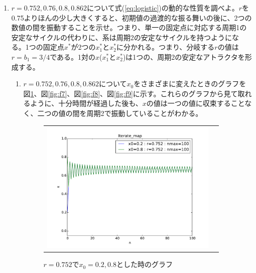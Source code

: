 \documentclass{jsarticle}
\begin{document}
\begin{enumerate}
\begin{enumerate}
\begin{figure}[H]
\begin{center}
\begin{tabular}{cc}
    \end{tabular}
    \end{center}
    \end{figure} 
  \end{enumerate}
  
 \item $r=0.752, 0.76, 0.8, 0.862$について式(\ref{eq:logistic})の動的な性質を調べよ。$r$を0.75よりほんの少し大きくすると、初期値の過渡的な振る舞いの後に、2つの数値の間を振動することを示せ。つまり、単一の固定点に対応する周期1の安定なサイクルの代わりに、系は周期2の安定なサイクルを持つようになる。1つの固定点$x^{*}$が2つの$x_{1}^{*}$と$x_{2}^{*}$に分かれる。つまり、分岐する$r$の値は$r=b_{1}=3/4$である。1対の$x$($x_{1}^{*}$と$x_{2}^{*}$)は1つの、周期2の安定なアトラクタを形成する。
 
  \begin{enumerate}
   \item $r=0.752, 0.76, 0.8, 0.862$について$x_{0}$をさまざまに変えたときのグラフを図\ref{fig:f6}、図\ref{fig:f7}、図\ref{fig:f8}、図\ref{fig:f9}に示す。これらのグラフから見て取れるように、十分時間が経過した後も、$x$の値は一つの値に収束することなく、二つの値の間を周期2で振動していることがわかる。
   
   \begin{figure}[H]
   \begin{center}
    \begin{tabular}{cc}
    
      \begin{minipage}{0.5\hsize}
	\begin{center}
	  \includegraphics[width=8.5cm]{figure_6.pdf}
	  \caption{$r=0.752$で$x_{0}=0.2, 0.8$とした時のグラフ}
	  \label{fig:f6}
	\end{center}
      \end{minipage}
      

\end{tabular}
\end{center}
\end{figure}
\end{enumerate}
\end{enumerate}
\end{document}
